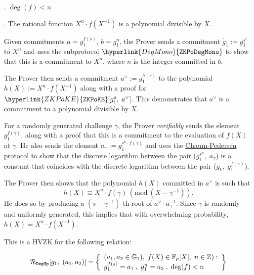 \documentclass[11pt, lettersize, notitlepage, leqno, footskip=0.6cm]{article}
\newcommand{\bz}{\mathbb Z}
\newcommand{\bFp}{\mathbb{F}_p}
\newcommand{\wti}{\widetilde}
\newcommand{\mc}{\mathcal}
\newcommand{\mb}{\mathbb}
\newcommand{\vs}{\vspace{-0.15cm}}
\newcommand{\noin}{\noindent}
\newcommand{\op}{overwhelming probability}
\newcommand{\Mod}[1]{\ (\mathrm{mod}\ #1)}
\numberwithin{equation}{section}
\begin{document}
\noin 1. $\deg(f) < n$ \vspace{1mm}

\noin 2. The rational function $X^n \cdot f(X^{-1})$ is a polynomial divisible by $X$. \vspace{2mm}


Given commitments $a = g_1^{f(s)}$, $b = g_1^n$, the  Prover sends a commitment $\wti{g}_1:= g_1^{s^n}$ to $X^n$ and uses the subprotocol $\hyperlink{DegMono}{\tt{ZKPoDegMono}}$ to show that this is a commitment to $X^n$, where $n$ is the integer committed in $b$.

The Prover then sends a commitment $a^{\vee}:= g_1^{h(s)}$ to the polynomial $h(X) := X^n \cdot f(X^{-1})$ along with a proof for $\hyperlink{ZKPoKE}{\tt{ZKPoKE}}[g_1^s,\;a^{\vee}]$. This demonstrates that $a^{\vee}$ is a commitment to a polynomial divisible by $X$.


For a randomly generated challenge $\gamma$, the Prover \textit{verifiably} sends the element $g_1^{f(\gamma)}. $ along with a proof that this is a commitment to the evaluation of $f(X)$ at $\gamma$. He also sends the element $a_{\gamma}:= g_1^{s^n\cdot f(\gamma)}$ and uses the \hyperlink{CP}{Chaum-Pedersen protocol} to show that the discrete logarithm between the pair ($g_1^{s^n},\; a_{\gamma}$) is a constant that coincides with the discrete logarithm between the pair ($g_1,\; g_1^{f(\gamma)}$).

The Prover then shows that the polynomial $h(X)$ committed in $a^{\vee}$ is such that \vs $$h(X)\equiv X^n\cdot f(\gamma)\Mod{(X-\gamma^{-1})}.  $$ He does so by producing a $(s-\gamma^{-1})$-th root of $a^{\vee}\cdot a_{\gamma}^{-1}$. Since $\gamma$ is randomly and uniformly generated, this implies that with \op, $h(X) = X^n\cdot f(X^{-1})$.

This is a HVZK for the following relation:

\vs $$\mc{R}_{\tt{DegUp}}[g_1,\;(a_1,a_2)] = \left\{\begin{array}{l}(a_1,a_2\in\mb{G}_1),\; f(X)\in \bFp[X],\; n\in \bz):\\ g_1^{f(s)} = a_1\;,\; g_1^{n} = a_2\;,\;\deg(f)< n \end{array}\right\} \vs $$
\end{document}
